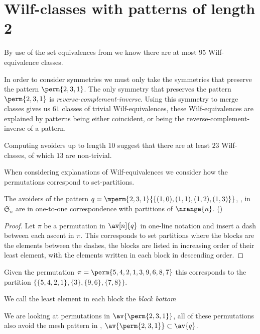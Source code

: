 \section{Wilf-classes with patterns of length 2}
By use of the set equivalences from  we know there are
at most \(95\) Wilf-equivalence classes.

In order to consider symmetries we must only take the symmetries that preserve
the pattern \(\perm{2,3,1}\). The only symmetry that preserves the pattern
\(\perm{2,3,1}\) is \emph{reverse-complement-inverse}. Using this
symmetry to merge classes gives us \(61\) classes of trivial
Wilf-equivalences, these Wilf-equivalences are explained by patterns being either
coincident, or being the reverse-complement-inverse of a pattern.

Computing avoiders up to length \(10\) suggest that there are at least \(23\)
Wilf-classes, of which \(13\) are non-trivial.

When considering explanations of Wilf-equivalences we consider how the
permutations correspond to set-partitions.

\begin{note}
    \label{not:setequiv}
    The avoiders of the pattern \(q = \mperm{2,3,1}{\{(1,0),(1,1),(1,2),(1,3)\}}\),
    ,
    in \(\mathfrak{S}_n\) are in one-to-one correspondence with partitions of
    \(\nrange{n}\). (\textcite[Prop.~2]{DBLP:journals/ejc/Claesson01})
\end{note}
\begin{proof}
    Let \(\pi\) be a permutation in \(\av[n]{q}\)
    in one-line notation and insert a dash between each ascent in \(\pi\). This
    corresponds to set partitions where the blocks are the elements between the
    dashes, the blocks are listed in increasing order of their least element,
    with the elements written in each block in descending order.
\end{proof}

\begin{example}
    Given the permutation \(\pi = \perm{5,4,2,1,3,9,6,8,7}\) this corresponds to the
    partition \(\{\{5,4,2,1\},\{3\},\{9,6\},\{7,8\}\}\).
\end{example}

We call the least element in each block the \emph{block bottom}

We are looking at permutations in \(\av{\perm{2,3,1}}\), all of these permutations
also avoid the mesh pattern in , \ie
\(\av{\perm{2,3,1}} \subset \av{q}\).

